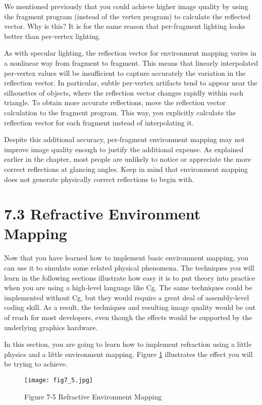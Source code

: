 \documentclass[../main.tex]{subfiles}
\begin{document}
We mentioned previously that you could achieve higher image quality by using the fragment program (instead of the vertex program) to calculate the reflected vector. Why is this? It is for the same reason that per-fragment lighting looks better than per-vertex lighting.

As with specular lighting, the reflection vector for environment mapping varies in a nonlinear way from fragment to fragment. This means that linearly interpolated per-vertex values will be insufficient to capture accurately the variation in the reflection vector. In particular, subtle per-vertex artifacts tend to appear near the silhouettes of objects, where the reflection vector changes rapidly within each triangle. To obtain more accurate reflections, move the reflection vector calculation to the fragment program. This way, you explicitly calculate the reflection vector for each fragment instead of interpolating it.

Despite this additional accuracy, per-fragment environment mapping may not improve image quality enough to justify the additional expense. As explained earlier in the chapter, most people are unlikely to notice or appreciate the more correct reflections at glancing angles. Keep in mind that environment mapping does not generate physically correct reflections to begin with.

\section{7.3 Refractive Environment Mapping}

Now that you have learned how to implement basic environment mapping, you can use it to simulate some related physical phenomena. The techniques you will learn in the following sections illustrate how easy it is to put theory into practice when you are using a high-level language like Cg. The same techniques could be implemented without Cg, but they would require a great deal of assembly-level coding skill. As a result, the techniques and resulting image quality would be out of reach for most developers, even though the effects would be supported by the underlying graphics hardware.

In this section, you are going to learn how to implement refraction using a little physics and a little environment mapping. Figure \ref{fig:7-5} illustrates the effect you will be trying to achieve.

\begin{figure}
    \centering
    \texttt{[image: fig7\_5.jpg]}
    \caption{Figure 7-5 Refractive Environment Mapping}
    \label{fig:7-5}
\end{figure}
\end{document}

